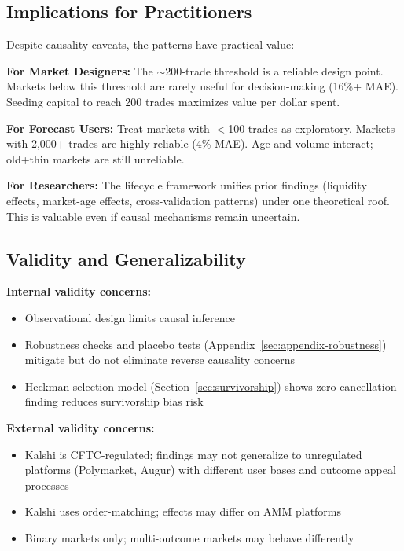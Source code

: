 \documentclass[12pt,letterpaper]{article}
\begin{document}
\subsection{Implications for Practitioners}

Despite causality caveats, the patterns have practical value:

\textbf{For Market Designers:} The $\sim$200-trade threshold is a reliable design point. Markets below this threshold are rarely useful for decision-making (16\%+ MAE). Seeding capital to reach 200 trades maximizes value per dollar spent.

\textbf{For Forecast Users:} Treat markets with $<$100 trades as exploratory. Markets with 2,000+ trades are highly reliable (4\% MAE). Age and volume interact; old+thin markets are still unreliable.

\textbf{For Researchers:} The lifecycle framework unifies prior findings (liquidity effects, market-age effects, cross-validation patterns) under one theoretical roof. This is valuable even if causal mechanisms remain uncertain.

\subsection{Validity and Generalizability}

\textbf{Internal validity concerns:}
\begin{itemize}
    \item Observational design limits causal inference
    \item Robustness checks and placebo tests (Appendix~\ref{sec:appendix-robustness}) mitigate but do not eliminate reverse causality concerns
    \item Heckman selection model (Section~\ref{sec:survivorship}) shows zero-cancellation finding reduces survivorship bias risk
\end{itemize}

\textbf{External validity concerns:}
\begin{itemize}
    \item Kalshi is CFTC-regulated; findings may not generalize to unregulated platforms (Polymarket, Augur) with different user bases and outcome appeal processes
    \item Kalshi uses order-matching; effects may differ on AMM platforms
    \item Binary markets only; multi-outcome markets may behave differently
\end{itemize}
\end{document}
